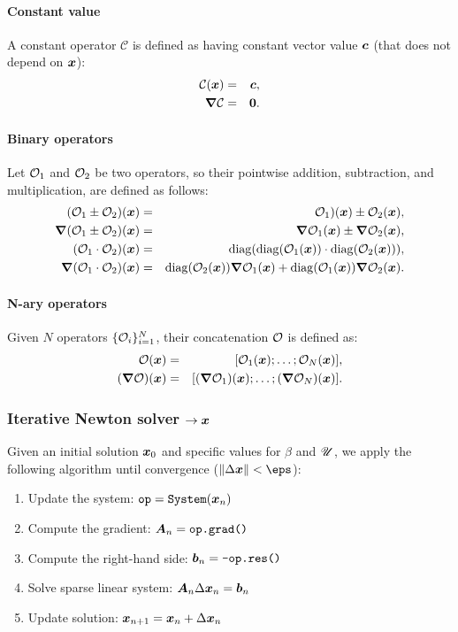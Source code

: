 \paragraph{Constant value}
A constant operator $\mathcal{C}$ is defined as having constant vector value $\boldsymbol{c}$ 
(that does not depend on $\boldsymbol{x}$):
\begin{eqnarray}
\mathcal{C}(\boldsymbol{x}) &=& \boldsymbol{c}, \\
\boldsymbol{\nabla}\mathcal{C} &=& \boldsymbol{0}.
\end{eqnarray}

\paragraph{Binary operators}
Let $\mathcal{O}_1$ and $\mathcal{O}_2$ be two operators, so their pointwise addition, subtraction,
and multiplication, are defined as follows:
\begin{eqnarray}
(\mathcal{O}_1 \pm \mathcal{O}_2)(\boldsymbol{x}) &=& \mathcal{O}_1)(\boldsymbol{x}) \pm \mathcal{O}_2(\boldsymbol{x}), \\
\boldsymbol{\nabla} (\mathcal{O}_1 \pm \mathcal{O}_2)(\boldsymbol{x})   &=& \boldsymbol{\nabla}\mathcal{O}_1(\boldsymbol{x}) \pm \boldsymbol{\nabla}\mathcal{O}_2(\boldsymbol{x}), \\
(\mathcal{O}_1 \cdot \mathcal{O}_2)(\boldsymbol{x}) &=& \mathrm{diag}(\mathrm{diag}(\mathcal{O}_1(\boldsymbol{x})) \cdot \mathrm{diag}(\mathcal{O}_2(\boldsymbol{x}))), \\
\boldsymbol{\nabla} (\mathcal{O}_1 \cdot \mathcal{O}_2)(\boldsymbol{x}) &=& \mathrm{diag}(\mathcal{O}_2(\boldsymbol{x})) \boldsymbol{\nabla}\mathcal{O}_1(\boldsymbol{x}) 
                                  + \mathrm{diag}(\mathcal{O}_1(\boldsymbol{x})) \boldsymbol{\nabla}\mathcal{O}_2(\boldsymbol{x}).
\end{eqnarray}

\paragraph{N-ary operators}
Given $N$ operators $\{\mathcal{O}_i\}_{i=1}^N$, their concatenation $\mathcal{O}$ is defined as:
\begin{eqnarray}
\mathcal{O}(\boldsymbol{x}) &=& [\mathcal{O}_1(\boldsymbol{x}); \ldots; \mathcal{O}_N(\boldsymbol{x})], \\
(\boldsymbol{\nabla}\mathcal{O})(\boldsymbol{x}) &=& [(\boldsymbol{\nabla}\mathcal{O}_1)(\boldsymbol{x}); \ldots; (\boldsymbol{\nabla}\mathcal{O}_N)(\boldsymbol{x})].
\end{eqnarray}

\subsubsection{Iterative Newton solver $\rightarrow \boldsymbol{x}$}
Given an initial solution $\boldsymbol{x}_0$ and specific values for $\beta$ and $\mathscr{U}$, 
we apply the following algorithm 
until convergence ($\|\Delta \bx\| < \eps$):
\begin{enumerate}
\item Update the system: $\verb|op| = \verb|System|(\bx_{n})$
\item Compute the gradient: $\boldsymbol{A}_n = \verb|op.grad()|$
\item Compute the right-hand side: $\boldsymbol{b}_n = \verb|-op.res()|$
\item Solve sparse linear system: $\boldsymbol{A}_n \Delta \boldsymbol{x}_n = \boldsymbol{b}_n$
\item Update solution: $\boldsymbol{x}_{n+1} = \boldsymbol{x}_{n} + \Delta \boldsymbol{x}_{n}$
\end{enumerate}

